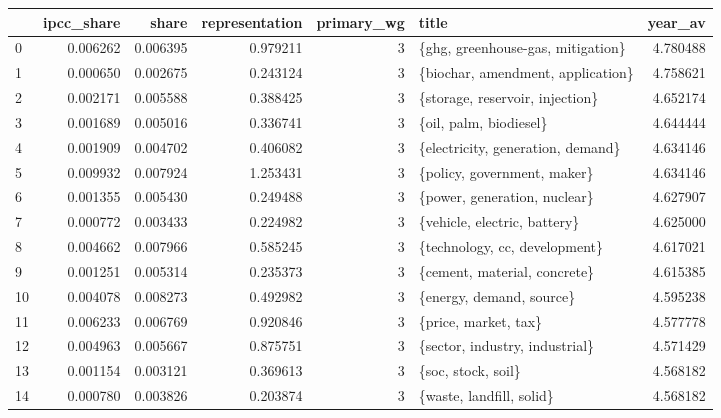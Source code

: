 \begin{tabular}{lrrrrlr}
\toprule
{} &  ipcc\_share &     share &  representation &  primary\_wg &                                   title &   year\_av \\
\midrule
0   &    0.006262 &  0.006395 &        0.979211 &           3 &       \{ghg, greenhouse-gas, mitigation\} &  4.780488 \\
1   &    0.000650 &  0.002675 &        0.243124 &           3 &       \{biochar, amendment, application\} &  4.758621 \\
2   &    0.002171 &  0.005588 &        0.388425 &           3 &         \{storage, reservoir, injection\} &  4.652174 \\
3   &    0.001689 &  0.005016 &        0.336741 &           3 &                  \{oil, palm, biodiesel\} &  4.644444 \\
4   &    0.001909 &  0.004702 &        0.406082 &           3 &       \{electricity, generation, demand\} &  4.634146 \\
5   &    0.009932 &  0.007924 &        1.253431 &           3 &             \{policy, government, maker\} &  4.634146 \\
6   &    0.001355 &  0.005430 &        0.249488 &           3 &            \{power, generation, nuclear\} &  4.627907 \\
7   &    0.000772 &  0.003433 &        0.224982 &           3 &            \{vehicle, electric, battery\} &  4.625000 \\
8   &    0.004662 &  0.007966 &        0.585245 &           3 &           \{technology, cc, development\} &  4.617021 \\
9   &    0.001251 &  0.005314 &        0.235373 &           3 &            \{cement, material, concrete\} &  4.615385 \\
10  &    0.004078 &  0.008273 &        0.492982 &           3 &                \{energy, demand, source\} &  4.595238 \\
11  &    0.006233 &  0.006769 &        0.920846 &           3 &                    \{price, market, tax\} &  4.577778 \\
12  &    0.004963 &  0.005667 &        0.875751 &           3 &          \{sector, industry, industrial\} &  4.571429 \\
13  &    0.001154 &  0.003121 &        0.369613 &           3 &                      \{soc, stock, soil\} &  4.568182 \\
14  &    0.000780 &  0.003826 &        0.203874 &           3 &                \{waste, landfill, solid\} &  4.568182 \\

\end{tabular}
